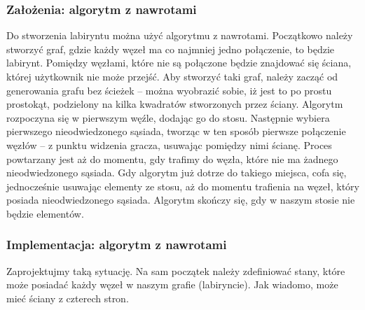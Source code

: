 \documentclass[oneside,polski,logo]{amuthesis}
\begin{document}
\subsubsection{Założenia: algorytm z nawrotami}
Do stworzenia labiryntu można użyć algorytmu z nawrotami. Początkowo należy stworzyć graf, gdzie każdy węzeł ma co najmniej jedno połączenie, to będzie labirynt. Pomiędzy węzłami, które nie są połączone będzie znajdować się ściana, której użytkownik nie może przejść. Aby stworzyć taki graf, należy zacząć od generowania grafu bez ścieżek – można wyobrazić sobie, iż jest to po prostu prostokąt, podzielony na kilka kwadratów stworzonych przez ściany. Algorytm rozpoczyna się w pierwszym węźle, dodając go do stosu. Następnie wybiera pierwszego nieodwiedzonego sąsiada, tworząc w ten sposób pierwsze połączenie węzłów – z punktu widzenia gracza, usuwając pomiędzy nimi ścianę. Proces powtarzany jest aż do momentu, gdy trafimy do węzła, które nie ma żadnego nieodwiedzonego sąsiada. Gdy algorytm już dotrze do takiego miejsca, cofa się, jednocześnie usuwając elementy ze stosu, aż do momentu trafienia na węzeł, który posiada nieodwiedzonego sąsiada. Algorytm skończy się, gdy w naszym stosie nie będzie elementów. \cite{maze}

\subsubsection{Implementacja: algorytm z nawrotami}
\par Zaprojektujmy taką sytuację. Na sam początek należy zdefiniować stany, które może posiadać każdy węzeł w naszym grafie (labiryncie). Jak wiadomo, może mieć ściany z czterech stron. 
\end{document}
